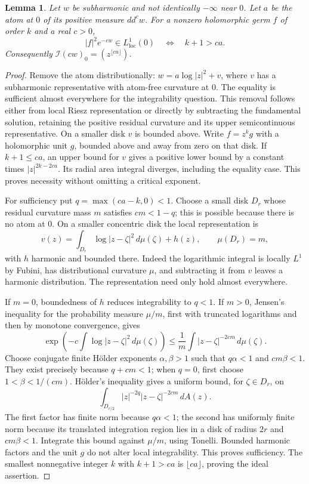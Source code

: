 \documentclass[11pt]{article}
\newtheorem{lemma}[theorem]{Lemma}
\newcommand{\II}{\mathcal I}
\begin{document}
\begin{lemma}\label{local}
Let $w$ be subharmonic and not identically $-\infty$ near $0$. Let $a$ be the atom at $0$ of its positive measure $dd^cw$. For a nonzero holomorphic germ $f$ of order $k$ and a real $c>0$,
\[
 |f|^2e^{-cw}\in L^1_{\mathrm{loc}}(0)
 \quad\Longleftrightarrow\quad k+1>ca.
\]
Consequently $\II(cw)_0=(z^{\lfloor ca\rfloor})$.
\end{lemma}
\begin{proof}
Remove the atom distributionally: $w=a\log|z|^2+v$, where $v$ has a subharmonic representative with atom-free curvature at $0$. The equality is sufficient almost everywhere for the integrability question. This removal follows either from local Riesz representation or directly by subtracting the fundamental solution, retaining the positive residual curvature and its upper semicontinuous representative. On a smaller disk $v$ is bounded above. Write $f=z^kg$ with a holomorphic unit $g$, bounded above and away from zero on that disk. If $k+1\leq ca$, an upper bound for $v$ gives a positive lower bound by a constant times $|z|^{2k-2ca}$. Its radial area integral diverges, including the equality case. This proves necessity without omitting a critical exponent.

For sufficiency put $q=\max(ca-k,0)<1$. Choose a small disk $D_r$ whose residual curvature mass $m$ satisfies $cm<1-q$; this is possible because there is no atom at $0$. On a smaller concentric disk the local representation is
\[
 v(z)=\int_{D_r}\log|z-\zeta|^2\,d\mu(\zeta)+h(z),
 \qquad \mu(D_r)=m,
\]
with $h$ harmonic and bounded there. Indeed the logarithmic integral is locally $L^1$ by Fubini, has distributional curvature $\mu$, and subtracting it from $v$ leaves a harmonic distribution. The representation need only hold almost everywhere.

If $m=0$, boundedness of $h$ reduces integrability to $q<1$. If $m>0$, Jensen's inequality for the probability measure $\mu/m$, first with truncated logarithms and then by monotone convergence, gives
\[
 \exp\left(-c\int\log|z-\zeta|^2\,d\mu(\zeta)\right)
 \leq\frac1m\int |z-\zeta|^{-2cm}\,d\mu(\zeta).
\]
Choose conjugate finite H\"older exponents $\alpha,\beta>1$ such that $q\alpha<1$ and $cm\beta<1$. They exist precisely because $q+cm<1$; when $q=0$, first choose $1<\beta<1/(cm)$. H\"older's inequality gives a uniform bound, for $\zeta\in D_r$, on
\[
 \int_{D_{r/2}} |z|^{-2q}|z-\zeta|^{-2cm}\,dA(z).
\]
The first factor has finite norm because $q\alpha<1$; the second has uniformly finite norm because its translated integration region lies in a disk of radius $2r$ and $cm\beta<1$. Integrate this bound against $\mu/m$, using Tonelli. Bounded harmonic factors and the unit $g$ do not alter local integrability. This proves sufficiency. The smallest nonnegative integer $k$ with $k+1>ca$ is $\lfloor ca\rfloor$, proving the ideal assertion.
\end{proof}
\end{document}
